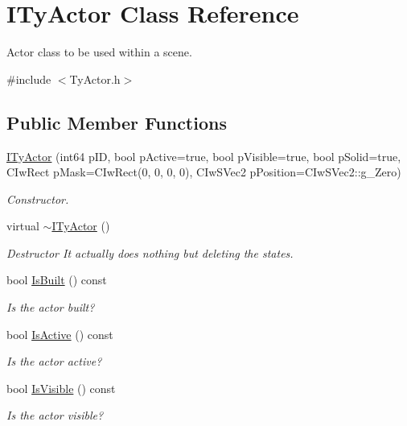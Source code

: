 \hypertarget{class_i_ty_actor}{
\section{ITyActor Class Reference}
\label{class_i_ty_actor}
}


Actor class to be used within a scene.  




{\ttfamily \#include $<$TyActor.h$>$}

\subsection*{Public Member Functions}
\begin{DoxyCompactItemize}
\item 
\hyperlink{class_i_ty_actor_afb266117deb0b8be81325ce76ef7c95b}{ITyActor} (int64 pID, bool pActive=true, bool pVisible=true, bool pSolid=true, CIwRect pMask=CIwRect(0, 0, 0, 0), CIwSVec2 pPosition=CIwSVec2::g\_\-Zero)
\begin{DoxyCompactList}\small\item\em Constructor. \end{DoxyCompactList}\item 
virtual \hyperlink{class_i_ty_actor_afc1f27393487c6422303523195c3922c}{$\sim$ITyActor} ()
\begin{DoxyCompactList}\small\item\em Destructor It actually does nothing but deleting the states. \end{DoxyCompactList}\item 
bool \hyperlink{class_i_ty_actor_af3670099e1c1e77d620c43125dac6e61}{IsBuilt} () const 
\begin{DoxyCompactList}\small\item\em Is the actor built? \end{DoxyCompactList}\item 
bool \hyperlink{class_i_ty_actor_abe293544e0a3823400aaf490b24ae81d}{IsActive} () const 
\begin{DoxyCompactList}\small\item\em Is the actor active? \end{DoxyCompactList}\item 
bool \hyperlink{class_i_ty_actor_a5e3d6f0fd5ab67afb6d56488b7a55595}{IsVisible} () const 
\begin{DoxyCompactList}\small\item\em Is the actor visible? \end{DoxyCompactList}\item 

\end{DoxyCompactItemize}
